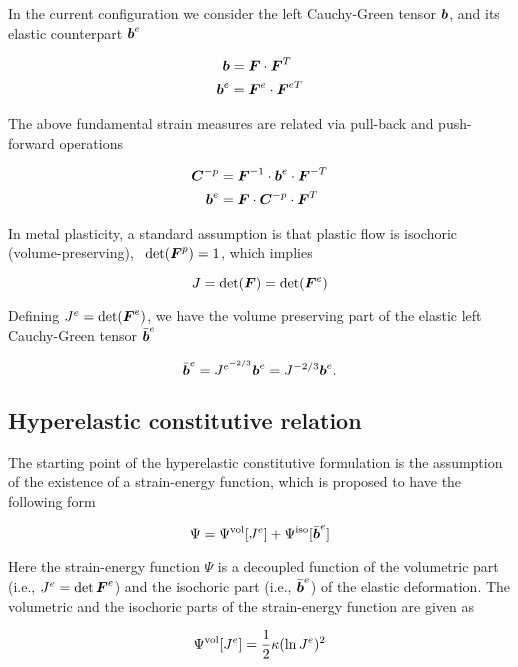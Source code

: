 In the current configuration we consider the left Cauchy-Green tensor
${\boldsymbol{b}}$, and its elastic counterpart ${{\boldsymbol{b}}}^e$

\begin{align}
  {\boldsymbol{b}} &= {\boldsymbol{F}} \cdot {\boldsymbol{F}}^{T}\\ {\boldsymbol{b}}^e &= {\boldsymbol{F}}^e \cdot
  {\boldsymbol{F}}^{eT}\label{eq:be}
\end{align}

The above fundamental strain measures are related via pull-back and
push-forward operations

\begin{align}\label{eq:pullpush}
  {\boldsymbol{C}}^{-p} &={\boldsymbol{F}}^{-1} \cdot {\boldsymbol{b}}^e \cdot {\boldsymbol{F}}^{-T}\\ {\boldsymbol{b}}^e &= {\boldsymbol{F}} \cdot
  {\boldsymbol{C}}^{-p} \cdot {\boldsymbol{F}}^T
\end{align}

In metal plasticity, a standard assumption is that plastic flow is
isochoric (volume-preserving), \ie\ $\det({\boldsymbol{F}}^p)=1$, which implies

\begin{equation}
  J = \det ({\boldsymbol{F}}) = \det ({\boldsymbol{F}}^e)
\end{equation}

Defining $J^e=\det({\boldsymbol{F}}^e)$, we have the volume preserving part of the
elastic left Cauchy-Green tensor $\bar{{\boldsymbol{b}}}^e$

\begin{equation}
  \bar{{\boldsymbol{b}}}^e = J^{e^{-2/3}}{\boldsymbol{b}}^e = J^{-2/3}{\boldsymbol{b}}^e.
\end{equation}

\subsection{Hyperelastic constitutive relation}

The starting point of the hyperelastic constitutive formulation is the
assumption of the existence of a strain-energy function, which is
proposed to have the following form

\begin{equation}
\Psi=\Psi^{\rm vol}[J^e] + \Psi^{\rm iso}[\bar{{\boldsymbol{b}}}^e]
\end{equation}

Here the strain-energy function $\Psi$ is a decoupled function of the
volumetric part (i.e., $J^e=\det{\boldsymbol{F}}^e$) and the isochoric part (i.e.,
$\bar{{\boldsymbol{b}}}^e$) of the elastic deformation. The volumetric and the
isochoric parts of the strain-energy function are given as

\begin{equation}
  \Psi^{\rm vol}[J^e] =\frac{1}{2}\kappa(\ln J^e)^2
\end{equation}

